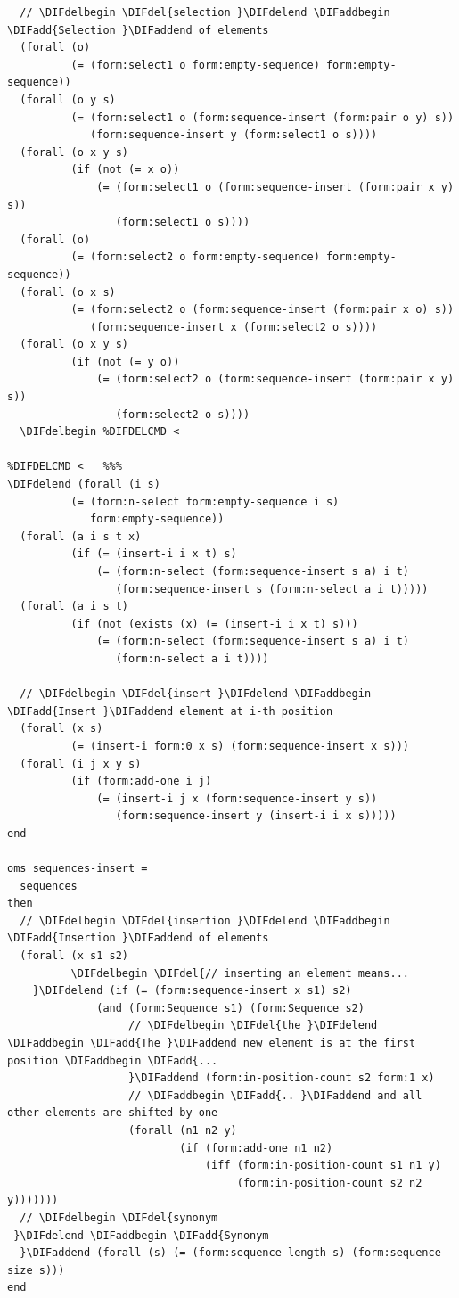 \documentclass[10pt,fleqn,final]{scrreprt}
\newenvironment{definitions}[0]{\medskip }{}
\providecommand{\DIFadd}[1]{{\protect\color{blue}\uwave{#1}}} %
\providecommand{\DIFdel}[1]{{\protect\color{red}\sout{#1}}}                      %
\providecommand{\DIFaddbegin}{} %
\providecommand{\DIFaddend}{} %
\providecommand{\DIFdelbegin}{} %
\providecommand{\DIFdelend}{} %
\begin{document}
\begin{definitions}
\begin{lstlisting}
  // \DIFdelbegin \DIFdel{selection }\DIFdelend \DIFaddbegin \DIFadd{Selection }\DIFaddend of elements
  (forall (o)
          (= (form:select1 o form:empty-sequence) form:empty-sequence))
  (forall (o y s)
          (= (form:select1 o (form:sequence-insert (form:pair o y) s)) 
             (form:sequence-insert y (form:select1 o s))))
  (forall (o x y s)
          (if (not (= x o))
              (= (form:select1 o (form:sequence-insert (form:pair x y) s)) 
                 (form:select1 o s))))
  (forall (o)
          (= (form:select2 o form:empty-sequence) form:empty-sequence))
  (forall (o x s)
          (= (form:select2 o (form:sequence-insert (form:pair x o) s)) 
             (form:sequence-insert x (form:select2 o s))))
  (forall (o x y s)
          (if (not (= y o))
              (= (form:select2 o (form:sequence-insert (form:pair x y) s)) 
                 (form:select2 o s))))
  \DIFdelbegin %DIFDELCMD < 

%DIFDELCMD <   %%%
\DIFdelend (forall (i s)
          (= (form:n-select form:empty-sequence i s) 
             form:empty-sequence))
  (forall (a i s t x)
          (if (= (insert-i i x t) s)
              (= (form:n-select (form:sequence-insert s a) i t)
                 (form:sequence-insert s (form:n-select a i t)))))
  (forall (a i s t)
          (if (not (exists (x) (= (insert-i i x t) s)))
              (= (form:n-select (form:sequence-insert s a) i t)
                 (form:n-select a i t))))

  // \DIFdelbegin \DIFdel{insert }\DIFdelend \DIFaddbegin \DIFadd{Insert }\DIFaddend element at i-th position
  (forall (x s)
          (= (insert-i form:0 x s) (form:sequence-insert x s)))
  (forall (i j x y s)
          (if (form:add-one i j)
              (= (insert-i j x (form:sequence-insert y s))
                 (form:sequence-insert y (insert-i i x s)))))
end

oms sequences-insert =
  sequences
then
  // \DIFdelbegin \DIFdel{insertion }\DIFdelend \DIFaddbegin \DIFadd{Insertion }\DIFaddend of elements
  (forall (x s1 s2)
          \DIFdelbegin \DIFdel{// inserting an element means...
    }\DIFdelend (if (= (form:sequence-insert x s1) s2)
              (and (form:Sequence s1) (form:Sequence s2)
                   // \DIFdelbegin \DIFdel{the }\DIFdelend \DIFaddbegin \DIFadd{The }\DIFaddend new element is at the first position \DIFaddbegin \DIFadd{...
                   }\DIFaddend (form:in-position-count s2 form:1 x)
                   // \DIFaddbegin \DIFadd{.. }\DIFaddend and all other elements are shifted by one
                   (forall (n1 n2 y)
                           (if (form:add-one n1 n2)
                               (iff (form:in-position-count s1 n1 y)
                                    (form:in-position-count s2 n2 y)))))))
  // \DIFdelbegin \DIFdel{synonym
 }\DIFdelend \DIFaddbegin \DIFadd{Synonym
  }\DIFaddend (forall (s) (= (form:sequence-length s) (form:sequence-size s)))
end


\end{lstlisting}
\end{definitions}
\end{document}
